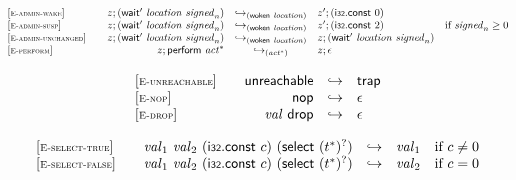 $$
\begin{array}[t]{@{}lrcl@{}l@{}}
{[\textsc{\scriptsize E{-}admin{-}wake}]} \quad & z ; (\mathsf{wait'}~{\mathit{location}}~{\mathit{signed}}_n) & {\hookrightarrow}_{(\mathsf{woken}~{\mathit{location}})} {} & {z'} ; (\mathsf{i{\scriptstyle 32}}{.}\mathsf{const}~0) \\
{[\textsc{\scriptsize E{-}admin{-}susp}]} \quad & z ; (\mathsf{wait'}~{\mathit{location}}~{\mathit{signed}}_n) & {\hookrightarrow}_{(\mathsf{woken}~{\mathit{location}})} {} & {z'} ; (\mathsf{i{\scriptstyle 32}}{.}\mathsf{const}~2) & \quad \mbox{if}~ {\mathit{signed}}_n \geq 0 \\
{[\textsc{\scriptsize E{-}admin{-}unchanged}]} \quad & z ; (\mathsf{wait'}~{\mathit{location}}~{\mathit{signed}}_n) & {\hookrightarrow}_{(\mathsf{woken}~{\mathit{location}})} {} & z ; (\mathsf{wait'}~{\mathit{location}}~{\mathit{signed}}_n) \\
{[\textsc{\scriptsize E{-}perform}]} \quad & z ; \mathsf{perform}~{{\mathit{act}}^\ast} & {\hookrightarrow}_{({{\mathit{act}}^\ast})} {} & z ; \epsilon \\
\end{array}
$$

\vspace{1ex}

$$
\begin{array}[t]{@{}lrcl@{}l@{}}
{[\textsc{\scriptsize E{-}unreachable}]} \quad & \mathsf{unreachable} & \hookrightarrow & \mathsf{trap} \\
{[\textsc{\scriptsize E{-}nop}]} \quad & \mathsf{nop} & \hookrightarrow & \epsilon \\
{[\textsc{\scriptsize E{-}drop}]} \quad & {\mathit{val}}~\mathsf{drop} & \hookrightarrow & \epsilon \\
\end{array}
$$

\vspace{1ex}

$$
\begin{array}[t]{@{}lrcl@{}l@{}}
{[\textsc{\scriptsize E{-}select{-}true}]} \quad & {\mathit{val}}_1~{\mathit{val}}_2~(\mathsf{i{\scriptstyle 32}}{.}\mathsf{const}~c)~(\mathsf{select}~{({t^\ast})^?}) & \hookrightarrow & {\mathit{val}}_1 & \quad \mbox{if}~ c \neq 0 \\
{[\textsc{\scriptsize E{-}select{-}false}]} \quad & {\mathit{val}}_1~{\mathit{val}}_2~(\mathsf{i{\scriptstyle 32}}{.}\mathsf{const}~c)~(\mathsf{select}~{({t^\ast})^?}) & \hookrightarrow & {\mathit{val}}_2 & \quad \mbox{if}~ c = 0 \\
\end{array}
$$

